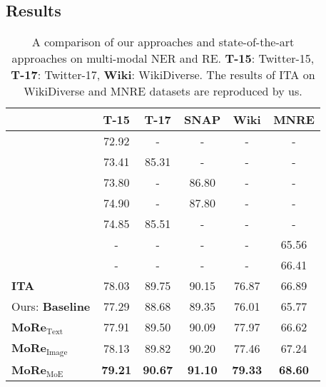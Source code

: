 \documentclass[11pt]{article}
\begin{document}
\subsection{Results}
\begin{table}[t!]
\small
\setlength\tabcolsep{3pt}
\centering
\begin{tabular}{l|ccccc}
\toprule
          & T-15 & T-17 & SNAP  & Wiki & MNRE    \\
\midrule
\citet{10.1145/3394171.3413650} & 72.92 & - & - & - & - \\
\citet{yu-etal-2020-improving-multimodal} & 73.41 & 85.31 & - & - & -\\
\citet{sun-etal-2020-riva} & 73.80 & - & 86.80  & - & -\\ 
\citet{Sun2021RpBERTAT} &74.90 & - & 87.80 & - & - \\
\citet{zhang2021multi} & 74.85 & 85.51 & -  & - & -\\
\citet{zheng2021mnre} & -  & - & - & - & 65.56\\
\citet{zheng2021multimodal} & - & - & - & - & 66.41\\
{\textbf{ITA}} & 78.03 & 89.75 & 90.15 & 76.87 & 66.89 \\
Ours: \textbf{Baseline}  & 77.29     & 88.68     & 89.35 & 76.01      & 65.77 \\
\textbf{MoRe}$_{\text{Text}}$ & 77.91     & 89.50     & 90.09 & 77.97      & 66.62 \\
\textbf{MoRe}$_{\text{Image}}$  & 78.13     & 89.82     & 90.20 & 77.46      & 67.24 \\
\textbf{MoRe}$_{\text{MoE}}$       & \textbf{79.21}     & \textbf{90.67}     & \textbf{91.10} & \textbf{79.33}      & \textbf{68.60} \\
\bottomrule
\end{tabular}
\caption{A comparison of our approaches and state-of-the-art approaches on multi-modal NER and RE. \textbf{T-15}: Twitter-15, \textbf{T-17}: Twitter-17, \textbf{Wiki}: WikiDiverse. The results of ITA on WikiDiverse and MNRE datasets are reproduced by us.}
\label{tab:main}
\end{table}
\end{document}
